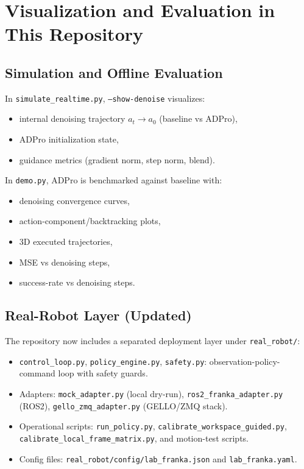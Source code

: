 \documentclass[11pt,a4paper]{article}
\begin{document}
\section{Visualization and Evaluation in This Repository}
\subsection{Simulation and Offline Evaluation}
In \texttt{simulate\_realtime.py}, \texttt{--show-denoise} visualizes:
\begin{itemize}
\item internal denoising trajectory $a_t\to a_0$ (baseline vs ADPro),
\item ADPro initialization state,
\item guidance metrics (gradient norm, step norm, blend).
\end{itemize}

In \texttt{demo.py}, ADPro is benchmarked against baseline with:
\begin{itemize}
\item denoising convergence curves,
\item action-component/backtracking plots,
\item 3D executed trajectories,
\item MSE vs denoising steps,
\item success-rate vs denoising steps.
\end{itemize}

\subsection{Real-Robot Layer (Updated)}
The repository now includes a separated deployment layer under \texttt{real\_robot/}:
\begin{itemize}
\item \texttt{control\_loop.py}, \texttt{policy\_engine.py}, \texttt{safety.py}: observation-policy-command loop with safety guards.
\item Adapters: \texttt{mock\_adapter.py} (local dry-run), \texttt{ros2\_franka\_adapter.py} (ROS2), \texttt{gello\_zmq\_adapter.py} (GELLO/ZMQ stack).
\item Operational scripts: \texttt{run\_policy.py}, \texttt{calibrate\_workspace\_guided.py}, \texttt{calibrate\_local\_frame\_matrix.py}, and motion-test scripts.
\item Config files: \texttt{real\_robot/config/lab\_franka.json} and \texttt{lab\_franka.yaml}.
\end{itemize}
\end{document}
